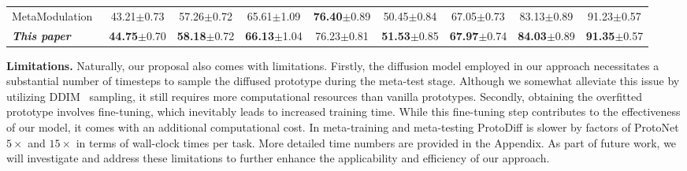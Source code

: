 \begin{table}[t]
{\begin{tabular}{lcccccccc}
MetaModulation~\cite{sun23metamodulation}  & {43.21}\textcolor{mygray}{\scriptsize{$\pm$0.73}}  & {57.26}\textcolor{mygray}{\scriptsize{$\pm$0.72}} & {65.61}\textcolor{mygray}{\scriptsize{$\pm$1.09}} & \textbf{76.40}\textcolor{mygray}{\scriptsize{$\pm$0.89}} & {50.45}\textcolor{mygray}{\scriptsize{$\pm$0.84}} & {67.05}\textcolor{mygray}{\scriptsize{$\pm$0.73}} &83.13\textcolor{mygray}{\scriptsize{$\pm$0.89}} & 91.23\textcolor{mygray}{\scriptsize{$\pm$0.57}} \\
\cmidrule{1-9}
\rowcolor{softblue}
\textbf{\textit{This paper}} & \textbf{44.75}\textcolor{mygray}{\scriptsize{$\pm$0.70}}  & \textbf{58.18}\textcolor{mygray}{\scriptsize{$\pm$0.72}}  & \textbf{66.13}\textcolor{mygray}{\scriptsize{$\pm$1.04}}   & {76.23}\textcolor{mygray}{\scriptsize{$\pm$0.81}}  &\textbf{51.53}\textcolor{mygray}{\scriptsize{$\pm$0.85}}  & \textbf{67.97}\textcolor{mygray}{\scriptsize{$\pm$0.74}}  &\textbf{84.03}\textcolor{mygray}{\scriptsize{$\pm$0.89}}    & \textbf{91.35}\textcolor{mygray}{\scriptsize{$\pm$0.57}}  \\
\bottomrule
\end{tabular}}
\label{tab:few-task}
\end{table}

\textbf{Limitations.} Naturally, our proposal also comes with limitations. Firstly, the diffusion model employed in our approach necessitates a substantial number of timesteps to sample the diffused prototype during the meta-test stage. Although we somewhat alleviate this issue by utilizing DDIM~\cite{song2020denoising} sampling, it still requires more computational resources than vanilla prototypes. 
Secondly, obtaining the overfitted prototype involves fine-tuning, which inevitably leads to increased training time. While this fine-tuning step contributes to the effectiveness of our model, it comes with an additional computational cost.  In meta-training and meta-testing  ProtoDiff is slower by factors of ProtoNet $5 \times$ and $15 \times$ in terms of wall-clock times per task.  More detailed time numbers are provided in the Appendix. As part of future work, we will investigate and address these limitations to further enhance the applicability and efficiency of our approach. 